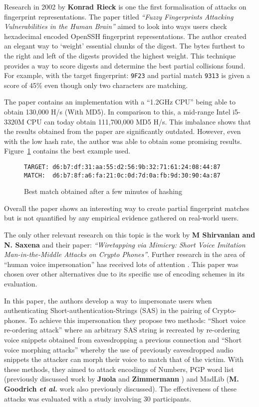 Research in 2002 by \textbf{Konrad Rieck}\cite{rieck2002fuzzy} is one the first formalisation of attacks on fingerprint representations. The paper titled \textit{``Fuzzy Fingerprints Attacking Vulnerabilities in the Human Brain''} aimed to look into ways users check hexadecimal encoded OpenSSH fingerprint representations. The author created an elegant way to `weight' essential chunks of the digest. The bytes furthest to the right and left of the digests provided the highest weight. This technique provides a way to score digests and determine the best partial collisions found. For example, with the target fingerprint: \verb|9F23| and partial match \verb|9313| is given a score of 45\% even though only two characters are matching.

The paper contains an implementation with a ``1.2GHz CPU'' being able to obtain 130,000 H/s (With MD5). In comparison to this, a mid-range Intel i5-3320M CPU can today obtain 111,700,000 MD5 H/s. This imbalance shows that the results obtained from the paper are significantly outdated. However, even with the low hash rate, the author was able to obtain some promising results. Figure~\ref{ref:fuzz} contains the best example used.

\begin{figure}[!h]
    \centering
    \verb|TARGET: d6:b7:df:31:aa:55:d2:56:9b:32:71:61:24:08:44:87|
    \verb|MATCH:  d6:b7:8f:a6:fa:21:0c:0d:7d:0a:fb:9d:30:90:4a:87|
    \caption{Best match obtained after a few minutes of hashing}
    \label{ref:fuzz}
\end{figure}

Overall the paper shows an interesting way to create partial fingerprint matches but is not quantified by any empirical evidence gathered on real-world users. 

The only other relevant research on this topic is the work by \textbf{M Shirvanian and N. Saxena}\cite{shirvanian2014wiretapping} 
and their paper: \textit{``Wiretapping via Mimicry: Short 
Voice Imitation Man-in-the-Middle Attacks on Crypto 
Phones''}. Further research in the area of ``human voice impersonation'' has received lots of attention \cite{mukhopadhyay2015all}\cite{chen2017you}\cite{wu2015spoofing}. This paper was chosen over other alternatives due to its specific use of encoding schemes in its evaluation.

In this paper, the authors develop a way to 
impersonate users when authenticating 
Short-authentication-Strings (SAS) in the pairing of 
Crypto-phones. To achieve this impersonation they propose 
two methods: ``Short voice re-ordering attack'' where an 
arbitrary SAS string is recreated by re-ordering voice snippets 
obtained from eavesdropping a previous connection
and ``Short voice morphing attacks'' whereby the use of 
previously eavesdropped audio snippets the attacker can
morph their voice to match that of the victim. With 
these methods, they aimed to attack encodings of Numbers, 
PGP word list (previously discussed work by \textbf{Juola} and 
\textbf{Zimmermann} \cite{juola1996whole}) and MadLib (\textbf{M. Goodrich 
\textit{et al.}}\cite{goodrich2006loud} work also 
previously discussed). The effectiveness of these attacks 
was evaluated with a study involving 30 participants.

